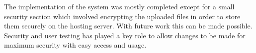 \documentclass[../main.tex]{subfiles}
\begin{document}
\raggedright
The implementation of the system was mostly completed except for a small security section which involved encrypting the uploaded files in order to store them securely on the hosting server. With future work this can be made possible. Security and user testing has played a key role to allow changes to be made for maximum security with easy access and usage. 
\end{document}
